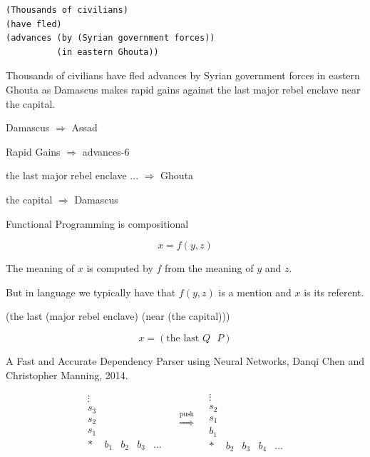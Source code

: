 {

\begin{verbatim}
(Thousands of civilians)
(have fled)
(advances (by (Syrian government forces))
          (in eastern Ghouta))
\end{verbatim}


{\color{blue} Thousands of civilians have fled advances by Syrian government forces in eastern Ghouta as}
Damascus makes rapid gains against the last major rebel enclave near the capital.

\vfill
Damascus $\Rightarrow$ Assad

\vfill
Rapid Gains $\Rightarrow$ advances-6

\vfill
the last major rebel enclave ... $\Rightarrow$ Ghouta

\vfill
the capital $\Rightarrow$ Damascus


Functional Programming is compositional

\vfill
$$x = f(y,z)$$

\vfill
The meaning of $x$ is computed by $f$ from the meaning of $y$ and $z$.

\vfill
But in language we typically have that $f(y,z)$ is a mention and $x$ is its referent.

\vfill
(the last (major rebel enclave) (near (the capital)))

\vfill
$$x = (\mbox{the last $Q$ $P$})$$


A Fast and Accurate Dependency Parser using Neural Networks,
Danqi Chen and Christopher Manning, 2014.

\vfill
$$\begin{array}{lllll}
  \vdots \\
  s_3 \\
    s_2 \\
    s_1 \\
    * & b_1 & b_2 & b_3 & \ldots
  \end{array}
  \;\;\;\;
  \stackrel{\mbox{push}}{\Rightarrow}
  \;\;\;
  \begin{array}{lllll}
    \vdots \\
    s_2 \\
    s_1 \\
    b_1 \\
    * & b_2 & b_3 & b_4 & \ldots
  \end{array}$$

}
